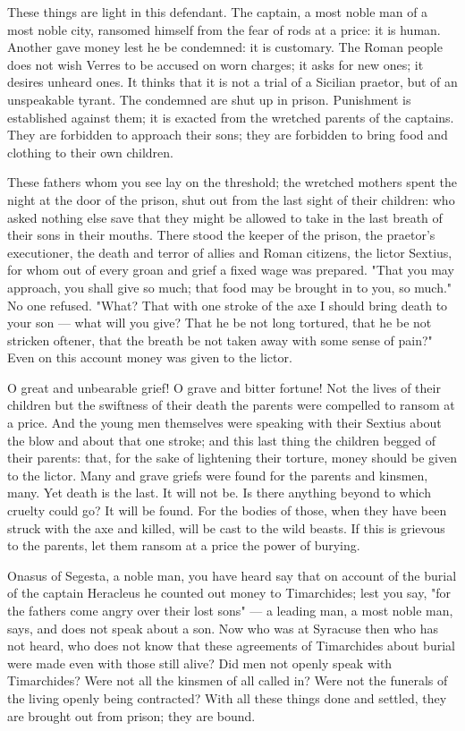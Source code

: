  These things are light in this defendant. The captain, a most noble man of a most noble city, ransomed himself from the fear of rods at a price: it is human. Another gave money lest he be condemned: it is customary. The Roman people does not wish Verres to be accused on worn charges; it asks for new ones; it desires unheard ones. It thinks that it is not a trial of a Sicilian praetor, but of an unspeakable tyrant. The condemned are shut up in prison. Punishment is established against them; it is exacted from the wretched parents of the captains. They are forbidden to approach their sons; they are forbidden to bring food and clothing to their own children.

 These fathers whom you see lay on the threshold; the wretched mothers spent the night at the door of the prison, shut out from the last sight of their children: who asked nothing else save that they might be allowed to take in the last breath of their sons in their mouths. There stood the keeper of the prison, the praetor's executioner, the death and terror of allies and Roman citizens, the lictor Sextius, for whom out of every groan and grief a fixed wage was prepared. "That you may approach, you shall give so much; that food may be brought in to you, so much." No one refused. "What? That with one stroke of the axe I should bring death to your son --- what will you give? That he be not long tortured, that he be not stricken oftener, that the breath be not taken away with some sense of pain?" Even on this account money was given to the lictor.

 O great and unbearable grief! O grave and bitter fortune! Not the lives of their children but the swiftness of their death the parents were compelled to ransom at a price. And the young men themselves were speaking with their Sextius about the blow and about that one stroke; and this last thing the children begged of their parents: that, for the sake of lightening their torture, money should be given to the lictor. Many and grave griefs were found for the parents and kinsmen, many. Yet death is the last. It will not be. Is there anything beyond to which cruelty could go? It will be found. For the bodies of those, when they have been struck with the axe and killed, will be cast to the wild beasts. If this is grievous to the parents, let them ransom at a price the power of burying.

 Onasus of Segesta, a noble man, you have heard say that on account of the burial of the captain Heracleus he counted out money to Timarchides; lest you say, "for the fathers come angry over their lost sons" --- a leading man, a most noble man, says, and does not speak about a son. Now who was at Syracuse then who has not heard, who does not know that these agreements of Timarchides about burial were made even with those still alive? Did men not openly speak with Timarchides? Were not all the kinsmen of all called in? Were not the funerals of the living openly being contracted? With all these things done and settled, they are brought out from prison; they are bound.

